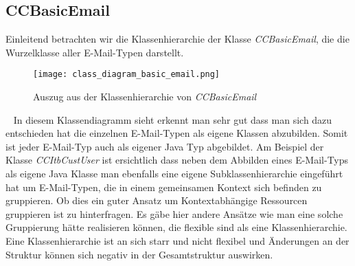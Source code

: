 \subsection{CCBasicEmail}
\label{sec:klassen_hierarchie_ccbasic_mail}
Einleitend betrachten wir die Klassenhierarchie der Klasse \emph{CCBasicEmail}, die die Wurzelklasse aller E-Mail-Typen darstellt.
\begin{figure}[h]
\centering
\texttt{[image: class\_diagram\_basic\_email.png]} 
\caption{Auszug aus der Klassenhierarchie von \emph{CCBasicEmail}}
\label{fig:klassen-hierarchie-ccbasicemail}
\end{figure}
\ \newpage
In diesem Klassendiagramm sieht erkennt man sehr gut dass man sich dazu entschieden hat die einzelnen E-Mail-Typen als eigene Klassen abzubilden. Somit ist jeder E-Mail-Typ auch als eigener Java Typ abgebildet. Am Beispiel der Klasse \emph{CCItbCustUser} ist ersichtlich dass neben dem Abbilden eines E-Mail-Typs als eigene Java Klasse man ebenfalls eine eigene Subklassenhierarchie eingeführt hat um E-Mail-Typen, die in einem gemeinsamen Kontext sich befinden zu gruppieren. Ob dies ein guter Ansatz um Kontextabhängige Ressourcen gruppieren ist zu hinterfragen. Es gäbe hier andere Ansätze wie man eine solche Gruppierung hätte realisieren können, die flexible sind als eine Klassenhierarchie. Eine Klassenhierarchie ist an sich starr und nicht flexibel und Änderungen an der Struktur können sich negativ in der Gesamtstruktur auswirken.
